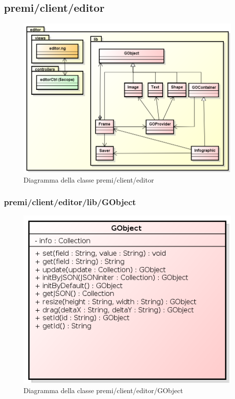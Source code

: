 \subsection{premi/client/editor}
\begin{figure}[h]
\begin{center}
\includegraphics[scale=0.40]{img/diapkg/editor.png}
\caption{Diagramma della classe premi/client/editor}
\end{center}
\end{figure}

\subsubsection{premi/client/editor/lib/GObject}
\begin{figure}[h]
\begin{center}
\includegraphics[scale=0.40]{img/diacla/GObject.png}
\caption{Diagramma della classe premi/client/editor/GObject}
\end{center}
\end{figure}

